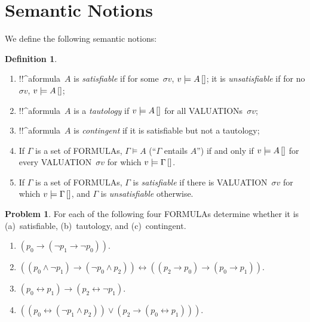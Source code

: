 \documentclass[10pt,a4paper]{article}
\newcommand*{\olup}[1]{\MakeUppercase{#1}}
\theoremstyle{plain}
\theoremstyle{definition}
\newtheorem{defn}[thm]{Definition}
\newtheorem{prob}{Problem}[section]
\theoremstyle{remark}
\newcommand*{\olfileid}[3]{}
\newcommand*{\olsection}[1]{\section*{#1}}
\providecommand{\lif}{\mathbin{\rightarrow}}
\providecommand{\Entails}{\mathrel{\models}}
\providecommand{\Obj}{}
\providecommand{\pSat}[3]{#1 \models #2\,[#3]}
\providecommand{\pAssign}{\sigma}
\providecommand{\liff}{\mathbin{\leftrightarrow}}
\begin{document}
\olfileid{pl}{syn}{sem}

\olsection{Semantic Notions}

We define the following semantic notions:

\begin{defn} 
\begin{enumerate}
\item !!^a{formula}~$A$ is \emph{satisfiable} if for
  some~$\pAssign{v}$, $\pSat{v}{A}$; it is
  \emph{unsatisfiable} if for no $\pAssign{v}$, $\pSat{v}{A}$;
\item !!^a{formula}~$A$ is a \emph{tautology} if $\pSat{v}{A}$ for
  all \olup{valuation}s~$\pAssign{v}$;
\item !!^a{formula}~$A$ is \emph{contingent} if it is satisfiable but
  not a tautology;
\item If $\Gamma$ is a set of \olup{formula}s, $\Gamma \Entails A$ (``$\Gamma$
  entails $A$'') if and only if $\pSat{v}{A}$ for every
  \olup{valuation}~$\pAssign{v}$ for which $\pSat{v}{\Gamma}$.
\item If $\Gamma$ is a set of \olup{formula}s, $\Gamma$ is
  \emph{satisfiable} if there is \olup{valuation}~$\pAssign{v}$ for which
  $\pSat{v}{\Gamma}$, and $\Gamma$ is
  \emph{unsatisfiable} otherwise.
\end{enumerate} 
\end{defn}

\begin{prob} 
 For each of the following four \olup{formula}s determine whether it
 is (a)~satisfiable, (b)~tautology, and (c)~contingent.
\begin{enumerate}
  \item \( ( \Obj p_0 \lif ( \lnot \Obj p_1 \lif \lnot \Obj p_0 ) ) \).
  \item \( ( ( \Obj p_0 \land \lnot \Obj p_1 ) \lif ( \lnot \Obj p_0 \land \Obj p_2 )) \liff ( ( \Obj p_2 \lif \Obj p_0 ) \lif ( \Obj p_0 \lif \Obj p_1 )) \).
  \item \( ( \Obj p_0 \liff \Obj p_1 ) \lif ( \Obj p_2 \liff \lnot \Obj p_1 ) \).
  \item \( (( \Obj p_0 \liff ( \lnot \Obj p_1 \land \Obj p_2 )) \lor ( \Obj p_2 \lif ( \Obj p_0 \liff \Obj p_1 ))) \).
\end{enumerate}
\end{prob}
\end{document}
